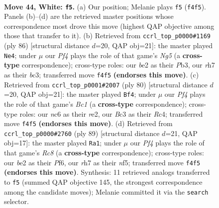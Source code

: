 \documentclass[11pt]{article}
\begin{document}
\clearpage

\begin{figure}[p]\centering
\begin{subfigure}{0.46\textwidth}\centering
\resizebox{\linewidth}{!}{%
\newchessgame
\chessboard[
  setfen={5k2/7r/p1n5/8/1P3P2/2B5/P3b1K1/2R5 w - - 2 44},
  showmover=false,
  pgfstyle=straightmove, color=movearrow, markmove={f4-f5}
]}
\caption{}
\end{subfigure}\hfill
\begin{subfigure}{0.46\textwidth}\centering
\resizebox{\linewidth}{!}{%
\newchessgame
\chessboard[
  setfen={7k/8/2B5/6Np/1p5P/1Pb1n3/6P1/2K5 w - - 5 44},
  showmover=false,
  pgfstyle=straightmove, color=movearrow, markmove={g5-e4}
]}
\caption{}
\end{subfigure}
\\[4pt]
\begin{subfigure}{0.46\textwidth}\centering
\resizebox{\linewidth}{!}{%
\newchessgame
\chessboard[
  setfen={6k1/8/7p/4P2P/2R1P1pb/8/4r3/2B3K1 w - - 2 41},
  showmover=false,
  pgfstyle=straightmove, color=movearrow, markmove={c1-f4}
]}
\caption{}
\end{subfigure}\hfill
\begin{subfigure}{0.46\textwidth}\centering
\resizebox{\linewidth}{!}{%
\newchessgame
\chessboard[
  setfen={8/5k2/1p3p2/2b2N2/6PP/1R6/6K1/2r5 b - - 0 45},
  showmover=false,
  pgfstyle=straightmove, color=movearrow, markmove={c1-a1}
]}
\caption{}
\end{subfigure}
\caption{\textbf{Move 44, White: \texttt{f5}.} (a) Our position; Melanie plays \texttt{f5} (\texttt{f4f5}). Panels (b)--(d) are the retrieved master positions whose correspondence most drove this move (highest QAP objective among those that transfer to it). (b) Retrieved from \texttt{ccrl\_top\_p0000\#1169} (ply 86) [structural distance $d$=20, QAP obj=21]: the master played \texttt{Ne4}; under $\mu$ our \emph{Pf4} plays the role of that game's \emph{Ng5} (a \textbf{cross-type} correspondence); cross-type roles: our \emph{b}e2 as their \emph{P}b3, our \emph{r}h7 as their \emph{b}c3; transferred move \texttt{f4f5} \textbf{(endorses this move)}. (c) Retrieved from \texttt{ccrl\_top\_p0001\#2007} (ply 80) [structural distance $d$=20, QAP obj=21]: the master played \texttt{Bf4}; under $\mu$ our \emph{Pf4} plays the role of that game's \emph{Bc1} (a \textbf{cross-type} correspondence); cross-type roles: our \emph{n}c6 as their \emph{r}e2, our \emph{B}c3 as their \emph{R}c4; transferred move \texttt{f4f5} \textbf{(endorses this move)}. (d) Retrieved from \texttt{ccrl\_top\_p0000\#2760} (ply 89) [structural distance $d$=21, QAP obj=17]: the master played \texttt{Ra1}; under $\mu$ our \emph{Pf4} plays the role of that game's \emph{Rc8} (a \textbf{cross-type} correspondence); cross-type roles: our \emph{b}e2 as their \emph{P}f6, our \emph{r}h7 as their \emph{n}f5; transferred move \texttt{f4f5} \textbf{(endorses this move)}. Synthesis: 11 retrieved analogs transferred to \texttt{f5} (summed QAP objective 145, the strongest correspondence among the candidate moves); Melanie committed it via the \texttt{search} selector.}
\label{fig:thought-m86}
\end{figure}
\end{document}
